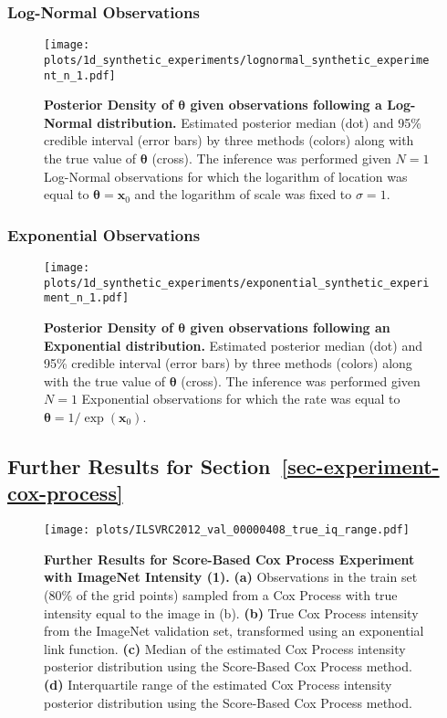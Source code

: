 \clearpage
\newpage
\subsubsection{Log-Normal Observations}
\begin{figure*}[h!]
\centering
\texttt{[image: plots/1d\_synthetic\_experiments/lognormal\_synthetic\_experiment\_n\_1.pdf]}
\caption{\textbf{Posterior Density of $\boldsymbol{\theta}$ given observations following a Log-Normal distribution.} Estimated posterior median (dot) and 95\% credible interval (error bars) by three methods (colors) along with the true value of $\boldsymbol{\theta}$ (cross). The inference was performed given $N=1$ Log-Normal observations for which the logarithm of location was equal to $\boldsymbol{\theta} = \mathbf{x}_0$ and the logarithm of scale was fixed to $\sigma =1$.}
\label{fig:synthetic-data-experiment-lognormal-1}
\end{figure*}


\subsubsection{Exponential Observations}
\begin{figure*}[h!]
\centering
\texttt{[image: plots/1d\_synthetic\_experiments/exponential\_synthetic\_experiment\_n\_1.pdf]}
\caption{\textbf{Posterior Density of $\boldsymbol{\theta}$ given observations following an Exponential distribution.} Estimated posterior median (dot) and 95\% credible interval (error bars) by three methods (colors) along with the true value of $\boldsymbol{\theta}$ (cross). The inference was performed given $N=1$ Exponential observations for which the rate was equal to $\boldsymbol{\theta} = 1 / \exp(\mathbf{x}_0)$.}
\label{fig:synthetic-data-experiment-exponential-1}
\end{figure*}



\clearpage
\newpage
\subsection{Further Results for Section~\ref{sec-experiment-cox-process}}
\label{app-further-experiment-cox-process}



\begin{figure*}[ht!]
\centering
\texttt{[image: plots/ILSVRC2012\_val\_00000408\_true\_iq\_range.pdf]}
\caption{\textbf{Further Results for Score-Based Cox Process Experiment with ImageNet Intensity (1).} \textbf{(a)} Observations in the train set (80\% of the grid points) sampled from a Cox Process with true intensity equal to the image in (b).  \textbf{(b)} True Cox Process intensity from the ImageNet validation set, transformed using an exponential link function. \textbf{(c)} Median of the estimated Cox Process intensity posterior distribution using the Score-Based Cox Process method.   \textbf{(d)} Interquartile range of the estimated Cox Process intensity posterior distribution using the Score-Based Cox Process method. }
\end{figure*}

